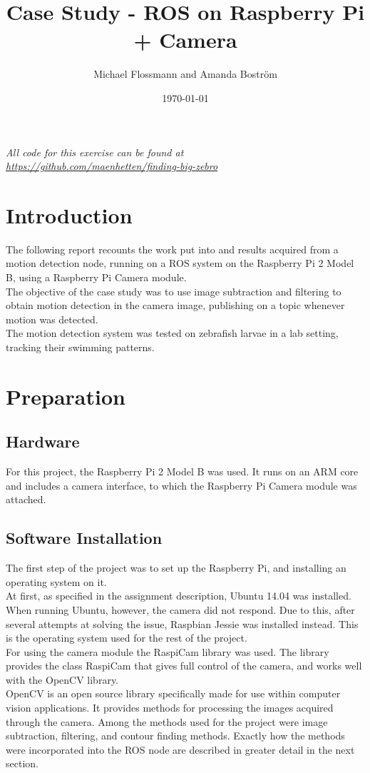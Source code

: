 \documentclass[10pt,a4paper, singlespace]{article}
\author{Michael Flossmann and Amanda Boström}
\title{Case Study - ROS on Raspberry Pi + Camera}
\date{\today}
\begin{document}
\maketitle

\begin{center}
  \emph{All code for this exercise can be found at \\ \url{https://github.com/maenhetten/finding-big-zebro}}
\end{center}

\section*{Introduction}

The following report recounts the work put into and results acquired from a motion detection node, running on a ROS system on the Raspberry Pi 2 Model B, using a Raspberry Pi Camera module.\\
The objective of the case study was to use image subtraction and filtering to obtain motion detection in the camera image, publishing on a topic whenever motion was detected. \\
The motion detection system was tested on zebrafish larvae in a lab setting, tracking their swimming patterns.



\section{Preparation}
\subsection{Hardware}

For this project, the Raspberry Pi 2 Model B was used. It runs on an ARM core and includes a camera interface, to which the Raspberry Pi Camera module was attached.

\subsection{Software Installation}

The first step of the project was to set up the Raspberry Pi, and installing an operating system on it. \\
At first, as specified in the assignment description, Ubuntu 14.04 was installed. When running Ubuntu, however, the camera did not respond. Due to this, after several attempts at solving the issue, Raspbian Jessie was installed instead. This is the operating system used for the rest of the project. \\
For using the camera module the RaspiCam library was used. The library provides the class RaspiCam that gives full control of the camera, and works well with the OpenCV library. \\
OpenCV is an open source library specifically made for use within computer vision applications. It provides methods for processing the images acquired through the camera. Among the methods used for the project were image subtraction, filtering, and contour finding methods. Exactly how the methods were incorporated into the ROS node are described in greater detail in the next section. \\
\end{document}
